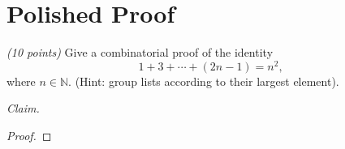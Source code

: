 \documentclass[12pt]{article}
\begin{document}
\section*{Polished Proof}

\emph{(10 points)} Give a combinatorial proof of the identity
\[
1 + 3 + \cdots + (2n - 1) = n^2,
\]
where \( n \in \mathbb{N} \). (Hint: group lists according to their largest element). \newline

\noindent \emph{Claim.}

\begin{proof}
\end{proof}
\end{document}
